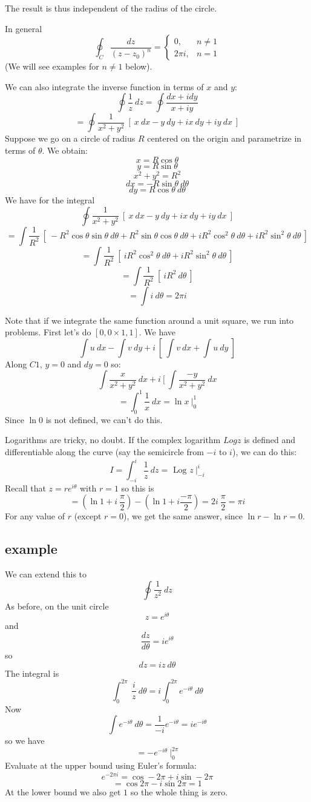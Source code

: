 \documentclass[11pt, oneside]{article}   	%
\begin{document}
The result is thus independent of the radius of the circle.

In general
\[ \oint_C \frac{dz}{(z - z_0)^n} = 
\begin{cases}
0, & n \ne 1 \\
2 \pi i, & n = 1 
\end {cases}
\]
(We will see examples for $n \ne 1$ below).

We can also integrate the inverse function in terms of $x$ and $y$:
\[ \oint \frac{1}{z} \ dz = \oint \frac{dx + i dy}{x + iy} \]
\[ = \oint \frac{1}{x^2+y^2} \ [ \  x \ dx - y \ dy + i x \ dy + i y \ dx \ ] \]
Suppose we go on a circle of radius $R$ centered on the origin and parametrize in terms of $\theta$.  We obtain:
\[ x = R \cos \theta \]
\[ y = R \sin \theta \]
\[ x^2 + y^2 = R^2 \]
\[ dx = - R \sin \theta \ d \theta \]
\[ dy = R \cos \theta \ d \theta \]
We have for the integral
\[ \oint \frac{1}{x^2+y^2} \ [ \  x \ dx - y \ dy + i x \ dy + i y \ dx \ ] \]
\[ = \int \frac{1}{R^2} \ [ \ -R^2 \cos \theta \sin \theta \ d \theta + R^2 \sin \theta \cos \theta \ d \theta + i R^2 \cos^2 \theta \ d \theta + i R^2 \sin^2 \theta \ d \theta \ ] \]
\[ = \int \frac{1}{R^2} \ [ \ i R^2 \cos^2 \theta \ d \theta + i R^2 \sin^2 \theta \ d \theta \ ] \]
\[ = \int \frac{1}{R^2} \ [ \ i R^2 \ d \theta \ ] \]
\[ = \int i \ d \theta = 2 \pi i \]

Note that if we integrate the same function around a unit square, we run into problems.  First let's  do $[0,0 \times 1,1]$.  We have
\[ \int u \ dx - \int v \ dy + i \ [ \ \int v \ dx + \int u \ dy \ ]  \]
Along $C1$, $y = 0$ and $dy = 0$ so:
\[ \int \frac{x}{x^2 + y^2} \ dx + i \ [ \ \int \frac{-y}{x^2 + y^2} \ dx \]
\[ = \int_0^1 \frac{1}{x} \ dx = \ln x \ \bigg |_0^1 \]
Since $\ln 0$ is not defined, we can't do this.

Logarithms are tricky, no doubt.  If the complex logarithm $Log z$ is defined and differentiable along the curve (say the semicircle from $-i$ to $i$), we can do this:
\[ I = \int_{-i}^i \frac{1}{z} \ dz = \text{ Log } z \ \bigg |_{-i}^i  \]
Recall that $z = re^{i\theta}$ with $r=1$ so this is
\[ = (\ln 1 + i \ \frac{\pi}{2} ) - (\ln 1 + i \frac{-\pi}{2} ) = 2i \ \frac{\pi}{2} = \pi i \]
For any value of $r$ (except $r=0$), we get the same answer, since $\ln r - \ln r = 0$.

\subsection*{example}
We can extend this to 
\[ \oint \frac{1}{z^2} \ dz \]
As before, on the unit circle
\[ z = e^{i\theta} \]
and
\[ \frac{dz}{d \theta} = i e^{i \theta} \]
so
\[ dz = i z \ d \theta \]
The integral is
\[ \int_0^{2 \pi} \ \frac{i}{z} \ d \theta =  i \int_0^{2 \pi} e^{-i\theta} \ d \theta \]
Now
\[ \int e^{-i\theta} \ d \theta = \frac{1}{-i} e^{-i\theta} = i e^{-i\theta} \]
so we have
\[ = - e^{-i\theta} \ \bigg |_0^{2 \pi}  \]
Evaluate at the upper bound using Euler's formula:
\[ e^{-2\pi i} = \cos -2 \pi + i \sin -2 \pi \]
\[ = \cos 2 \pi - i \sin 2 \pi = 1 \]
At the lower bound we also get $1$ so the whole thing is zero.
\end{document}
